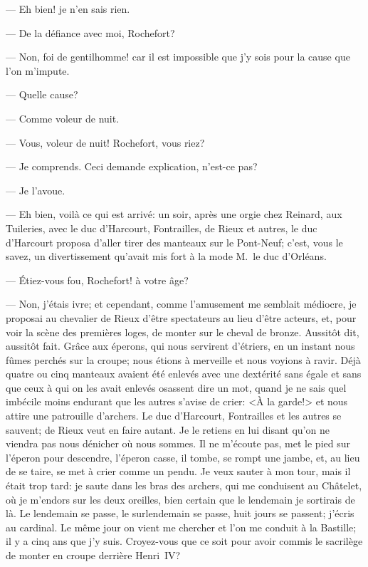 — Eh bien! je n'en sais rien.

— De la défiance avec moi, Rochefort?

— Non, foi de gentilhomme! car il est impossible que j'y sois pour la cause que l'on m'impute.

— Quelle cause?

— Comme voleur de nuit.

— Vous, voleur de nuit! Rochefort, vous riez?

— Je comprends. Ceci demande explication, n'est-ce pas?

— Je l'avoue.

— Eh bien, voilà ce qui est arrivé: un soir, après une orgie chez Reinard, aux Tuileries, avec le duc d'Harcourt, Fontrailles, de Rieux et autres, le duc d'Harcourt proposa d'aller tirer des manteaux sur le Pont-Neuf; c'est, vous le savez, un divertissement qu'avait mis fort à la mode M.~le duc d'Orléans.

— Étiez-vous fou, Rochefort! à votre âge?

— Non, j'étais ivre; et cependant, comme l'amusement me semblait médiocre, je proposai au chevalier de Rieux d'être spectateurs au lieu d'être acteurs, et, pour voir la scène des premières loges, de monter sur le cheval de bronze. Aussitôt dit, aussitôt fait. Grâce aux éperons, qui nous servirent d'étriers, en un instant nous fûmes perchés sur la croupe; nous étions à merveille et nous voyions à ravir. Déjà quatre ou cinq manteaux avaient été enlevés avec une dextérité sans égale et sans que ceux à qui on les avait enlevés osassent dire un mot, quand je ne sais quel imbécile moins endurant que les autres s'avise de crier: <À la garde!> et nous attire une patrouille d'archers. Le duc d'Harcourt, Fontrailles et les autres se sauvent; de Rieux veut en faire autant. Je le retiens en lui disant qu'on ne viendra pas nous dénicher où nous sommes. Il ne m'écoute pas, met le pied sur l'éperon pour descendre, l'éperon casse, il tombe, se rompt une jambe, et, au lieu de se taire, se met à crier comme un pendu. Je veux sauter à mon tour, mais il était trop tard: je saute dans les bras des archers, qui me conduisent au Châtelet, où je m'endors sur les deux oreilles, bien certain que le lendemain je sortirais de là. Le lendemain se passe, le surlendemain se passe, huit jours se passent; j'écris au cardinal. Le même jour on vient me chercher et l'on me conduit à la Bastille; il y a cinq ans que j'y suis. Croyez-vous que ce soit pour avoir commis le sacrilège de monter en croupe derrière Henri~IV?

